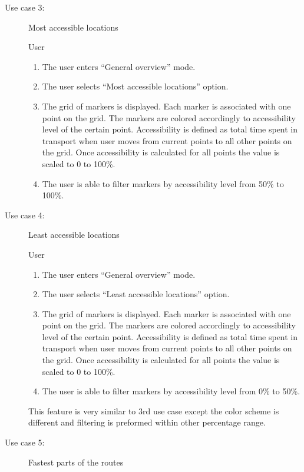 \begin{description}
  \item[Use case 3:] Most accessible locations

  \underline{} User

  \underline{}
  \begin{enumerate}
    \item The user enters ``General overview'' mode.
    \item The user selects ``Most accessible locations'' option.
    \item The grid of markers is displayed. Each marker is associated with one
    point on the grid. The markers are colored accordingly to accessibility level of the
    certain point. Accessibility is defined as total time spent in transport when user
    moves from current points to all other points on the grid. Once accessibility
    is calculated for all points the value is scaled to 0 to 100\%.
    \item The user is able to filter markers by accessibility level from 50\% to 100\%.
  \end{enumerate}

  \item[Use case 4:] Least accessible locations

  \underline{} User

  \underline{}
  \begin{enumerate}
    \item The user enters ``General overview'' mode.
    \item The user selects ``Least accessible locations'' option.
    \item The grid of markers is displayed. Each marker is associated with one
    point on the grid. The markers are colored accordingly to accessibility level of the
    certain point. Accessibility is defined as total time spent in transport when user
    moves from current points to all other points on the grid. Once accessibility
    is calculated for all points the value is scaled to 0 to 100\%.
    \item The user is able to filter markers by accessibility level from 0\% to 50\%.
  \end{enumerate}

  \underline{} This feature is very similar to 3rd use case except
  the color scheme is different and filtering is preformed within other percentage range.

  \item[Use case 5:] Fastest parts of the routes


\end{description}
